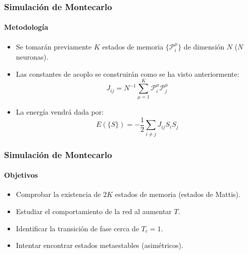 \documentclass[11pt]{beamer}
\begin{document}
\begin{frame}
\frametitle{Simulación de Montecarlo}
\framesubtitle{Metodología}
\begin{itemize}
\item Se tomarán previamente $K$ estados de memoria $\{ \mathcal{P}^{\mu}_{i} \}$ de dimensión $N$ ($N$ neuronas).
\item Las constantes de acoplo se construirán como se ha visto anteriormente:
$$
J_{ij} = N^{-1} \sum_{\mu = 1}^{K} \mathcal{P}^{\mu}_{i} \mathcal{P}^{\mu}_{j}
$$
\item La energía vendrá dada por:
$$
E(\{S\}) = - \frac{1}{2} \sum_{i \neq j} J_{ij} S_{i} S_{j}
$$
\end{itemize}   
\end{frame}

\begin{frame}
\frametitle{Simulación de Montecarlo}
\framesubtitle{Objetivos}
\begin{itemize}
\item Comprobar la existencia de $2K$ estados de memoria (estados de Mattis).
\item Estudiar el comportamiento de la red al aumentar $T$.
\item Identificar la transición de fase cerca de $T_{c} = 1$.
\item Intentar encontrar estados metaestables (asimétricos).
\end{itemize}   
\end{frame}
\end{document}
